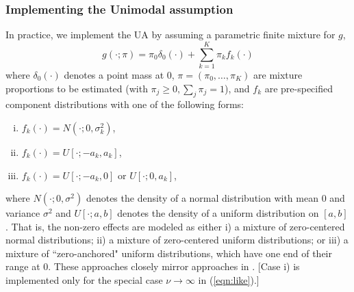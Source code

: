 \documentclass[11pt]{article}
\begin{document}
\subsubsection*{Implementing the Unimodal assumption}
 
In practice, we implement the UA by assuming a parametric finite mixture for $g$, 
\begin{equation} \label{eqn:g}
g(\cdot; \pi) = \pi_0 \delta_0(\cdot) + \sum_{k=1}^K \pi_k f_k(\cdot) 
\end{equation}
where $\delta_0(\cdot)$ denotes a point mass at 0, $\pi=(\pi_0,\dots,\pi_K)$ are mixture proportions to be estimated (with $\pi_j \geq 0, \sum_j \pi_j=1$), and $f_k$ are pre-specified 
component distributions with one of the following forms: 
\begin{enumerate}[i)]
\item $f_k(\cdot) = N(\cdot; 0, \sigma^2_k)$,
\item $f_k(\cdot) = U[\cdot; -a_k,a_k]$,
\item $f_k(\cdot) = U[\cdot; -a_k,0] \text{ or } U[\cdot; 0,a_k]$,
\end{enumerate}
where $N(\cdot; 0,\sigma^2)$ denotes the density of a normal distribution with mean 0 and variance $\sigma^2$ and
$U[\cdot; a,b]$ denotes the density of a uniform distribution on $[a,b]$.
That is, the non-zero effects are modeled as either i) a mixture of zero-centered normal distributions; ii) a mixture of zero-centered uniform distributions;
or iii) a mixture of ``zero-anchored" uniform distributions, which have one end of their range at 0. These approaches closely mirror approaches in \cite{cordy1997deconvolution}.
[Case i) is implemented only for the special case $\nu \rightarrow \infty$ in (\ref{eqn:like}).]
 
\end{document}
